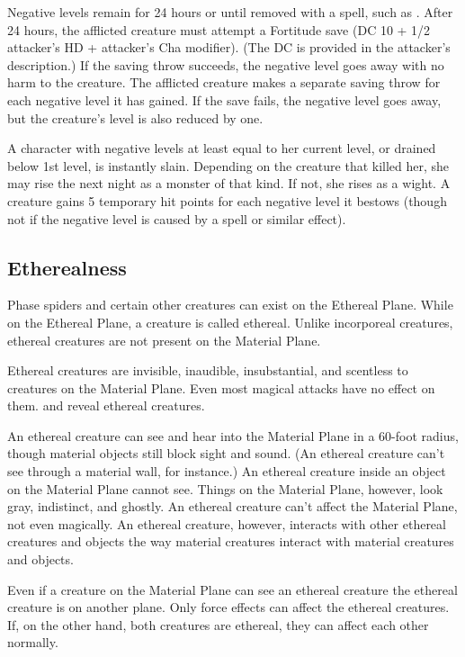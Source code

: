 Negative levels remain for 24 hours or until removed with a spell, such as .
After 24 hours, the afflicted creature must attempt a Fortitude save (DC 10 + 
1/2 attacker's HD + attacker's Cha modifier). (The DC is provided in the attacker's 
description.) If the saving throw succeeds, the negative level goes away with no 
harm to the creature. The afflicted creature makes a separate saving throw for 
each negative level it has gained. If the save fails, the negative level goes away, 
but the creature's level is also reduced by one.

A character with negative levels at least equal to her current level, or drained 
below 1st level, is instantly slain. Depending on the creature that killed her, 
she may rise the next night as a monster of that kind. If not, she rises as a wight. 
A creature gains 5 temporary hit points for each negative level it bestows (though 
not if the negative level is caused by a spell or similar effect).

\subsection{Etherealness}

Phase spiders and certain other creatures can exist on the Ethereal Plane. While 
on the Ethereal Plane, a creature is called ethereal. Unlike incorporeal creatures, 
ethereal creatures are not present on the Material Plane.

Ethereal creatures are invisible, inaudible, insubstantial, and scentless to creatures 
on the Material Plane. Even most magical attacks have no effect on them. 
and  reveal ethereal creatures.

An ethereal creature can see and hear into the Material Plane in a 60-foot radius, 
though material objects still block sight and sound. (An ethereal creature can't 
see through a material wall, for instance.) An ethereal creature inside an object 
on the Material Plane cannot see. Things on the Material Plane, however, look gray, 
indistinct, and ghostly. An ethereal creature can't affect the Material Plane, 
not even magically. An ethereal creature, however, interacts with other ethereal 
creatures and objects the way material creatures interact with material creatures 
and objects.

Even if a creature on the Material Plane can see an ethereal creature the ethereal 
creature is on another plane. Only force effects can affect the ethereal creatures. 
If, on the other hand, both creatures are ethereal, they can affect each other 
normally.


